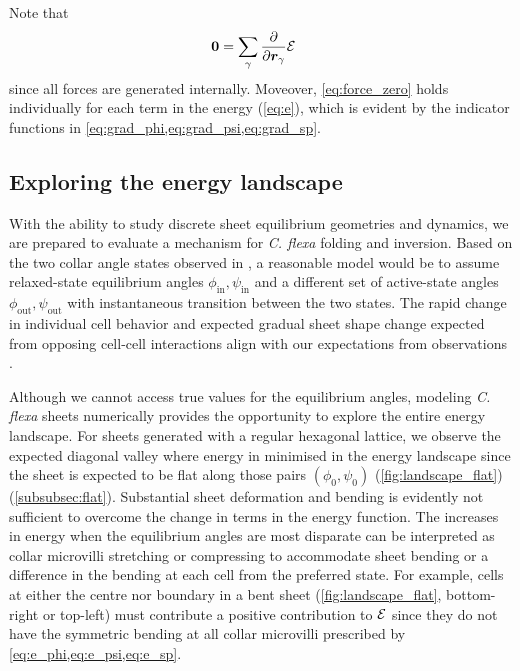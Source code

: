 % 

Note that 
\begin{align}
	\bm{0} &= \sum_\gamma \frac{\partial}{\partial\bm{r}_\gamma} \mathcal{E} \label{eq:force_zero}
\end{align}
since all forces are generated internally.
Moveover, \cref{eq:force_zero} holds individually for each term in the energy (\cref{eq:e}), which is evident by the indicator functions in \cref{eq:grad_phi,eq:grad_psi,eq:grad_sp}.

\subsection{Exploring the energy landscape} \label{subsec:landscape}

With the ability to study discrete sheet equilibrium geometries and dynamics, we are prepared to evaluate a mechanism for \textit{C. flexa} folding and inversion. 
Based on the two collar angle states observed in \citet{brunet2019}, a reasonable model would be to assume relaxed-state equilibrium angles $\phi_{\text{in}}, \psi_{\text{in}}$ and a different set of active-state angles $\phi_{\text{out}}, \psi_{\text{out}}$ with instantaneous transition between the two states. 
The rapid change in individual cell behavior and expected gradual sheet shape change expected from opposing cell-cell interactions align with our expectations from observations \citet{brunet2019}. 

Although we cannot access true values for the equilibrium angles, modeling \textit{C. flexa} sheets numerically provides the opportunity to explore the entire energy landscape. 
For sheets generated with a regular hexagonal lattice, we observe the expected diagonal valley where energy in minimised in the energy landscape since the sheet is expected to be flat along those pairs $(\phi_0, \psi_0)$ (\cref{fig:landscape_flat}) (\cref{subsubsec:flat}).
Substantial sheet deformation and bending is evidently not sufficient to overcome the change in terms in the energy function. 
The increases in energy when the equilibrium angles are most disparate can be interpreted as collar microvilli stretching or compressing to accommodate sheet bending or a difference in the bending at each cell from the preferred state. 
For example, cells at either the centre nor boundary in a bent sheet (\cref{fig:landscape_flat}, bottom-right or top-left) must contribute a positive contribution to $\mathcal{E}$ since they do not have the symmetric bending at all collar microvilli prescribed by \cref{eq:e_phi,eq:e_psi,eq:e_sp}.

